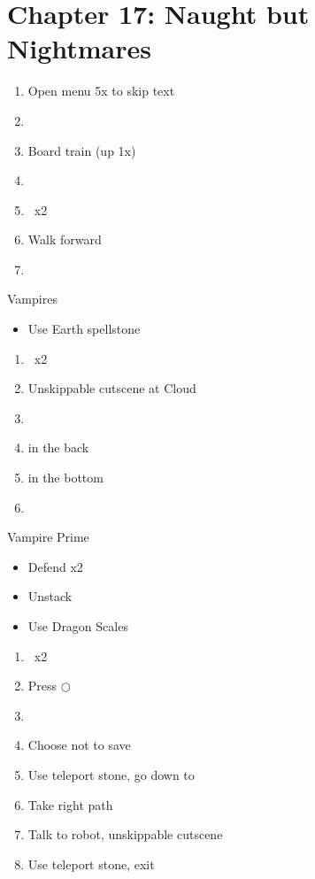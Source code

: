 \chapter{Chapter 17: Naught but Nightmares}
\begin{enumerate}
    \item Open menu 5x to skip text
    \item \cs\
    \item Board train (up 1x)
    \item \cs\
    \item \cs\ x2
    \item Walk forward
    \item \cs\
\end{enumerate}
\begin{battle}[]{Vampires}
    \begin{itemize}
        \item Use Earth spellstone
    \end{itemize}
\end{battle}
\begin{enumerate}[resume]
    \item \cs\ x2
    \item Unskippable cutscene at Cloud
    \item {}
    \item {} in the back
    \item \pickup{Wearwheel 2} in the bottom
    \item \cs\
\end{enumerate}
\begin{battle}[]{Vampire Prime}
    \begin{itemize}
        \item Defend x2
        \item Unstack
        \item Use Dragon Scales
    \end{itemize}
\end{battle}
\begin{enumerate}[resume]
    \item \cs\ x2
    \item Press $\bigcirc$
    \item \cs\
    \item Choose not to save
    \item Use teleport stone, go down to 
    \item Take right path
    \item Talk to robot, unskippable cutscene
    \item Use teleport stone, exit 
\end{enumerate}